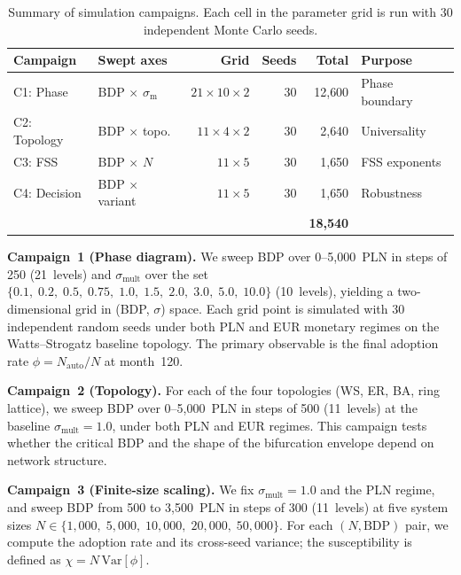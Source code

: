 \documentclass[12pt,a4paper]{article}
\begin{document}
\begin{table}[htbp]
\centering
\caption{Summary of simulation campaigns. Each cell in the parameter grid is
run with 30 independent Monte Carlo seeds.}
\label{tab:campaigns}
\small
\begin{tabular}{@{}l l r r r l@{}}
\toprule
Campaign & Swept axes & Grid & Seeds & Total & Purpose \\
\midrule
C1: Phase    & BDP $\times$ $\sigma_\mathrm{m}$ & $21\!\times\!10\!\times\!2$ & 30 & 12{,}600 & Phase boundary \\
C2: Topology & BDP $\times$ topo.              & $11\!\times\!4\!\times\!2$  & 30 & 2{,}640  & Universality \\
C3: FSS      & BDP $\times$ $N$                & $11\!\times\!5$             & 30 & 1{,}650  & FSS exponents \\
C4: Decision & BDP $\times$ variant            & $11\!\times\!5$             & 30 & 1{,}650  & Robustness \\
\midrule
             &                                 &                             &    & \textbf{18{,}540} & \\
\bottomrule
\end{tabular}
\end{table}

\textbf{Campaign~1 (Phase diagram).} We sweep BDP over 0--5{,}000~PLN in
steps of 250 (21~levels) and $\sigma_{\mathrm{mult}}$ over the set $\{0.1,\;
0.2,\; 0.5,\; 0.75,\; 1.0,\; 1.5,\; 2.0,\; 3.0,\; 5.0,\; 10.0\}$
(10~levels), yielding a two-dimensional grid in (BDP, $\sigma$) space.
Each grid point is simulated with 30 independent random seeds under both PLN
and EUR monetary regimes on the Watts--Strogatz baseline topology. The
primary observable is the final adoption rate $\phi = N_{\mathrm{auto}} / N$
at month~120.

\textbf{Campaign~2 (Topology).} For each of the four topologies (WS, ER, BA,
ring lattice), we sweep BDP over 0--5{,}000~PLN in steps of 500 (11~levels)
at the baseline $\sigma_{\mathrm{mult}} = 1.0$, under both PLN and EUR
regimes. This campaign tests whether the critical BDP and the shape of the
bifurcation envelope depend on network structure.

\textbf{Campaign~3 (Finite-size scaling).} We fix $\sigma_{\mathrm{mult}} =
1.0$ and the PLN regime, and sweep BDP from 500 to 3{,}500~PLN in steps of 300
(11~levels) at five system sizes $N \in \{1{,}000,\; 5{,}000,\; 10{,}000,\;
20{,}000,\; 50{,}000\}$. For each $(N, \mathrm{BDP})$ pair, we compute the
adoption rate and its cross-seed variance; the susceptibility is defined as
$\chi = N \, \mathrm{Var}[\phi]$.
\end{document}

